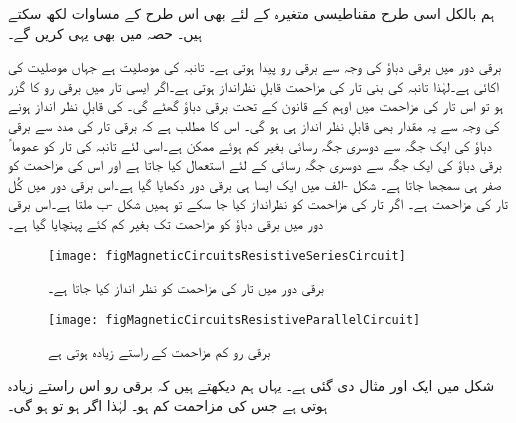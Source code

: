 	ہم بالکل اسی طرح مقناطیسی متغیرہ کے لئے بھی اس طرح کے مساوات لکھ سکتے ہیں۔ حصہ   میں بھی یہی کریں گے۔

	برقی دور میں برقی دباؤ    کی وجہ سے برقی رو  پیدا ہوتی ہے۔ تانبہ   کی موصلیت  ہے جہاں  موصلیت کی اکائی ہے۔لہٰذا تانبہ کی بنی تار کی مزاحمت    قابلِ نظرانداز ہوتی ہے۔اگر ایسی تار میں برقی رو  کا گزر ہو  تو اس تار کی مزاحمت میں اوہم کے قانون کے تحت  برقی دباؤ   گھٹے  گی۔ کی قابلِ نظر انداز ہونے کی وجہ سے یہ مقدار بھی قابلِ نظر انداز ہی ہو گی۔ اس کا مطلب ہے کہ برقی تار کی مدد سے برقی دباؤ کی ایک جگہ سے دوسری جگہ رسائی بغیر کم ہوئے ممکن ہے۔اسی لئے تانبہ کی تار کو عموما ً برقی دباؤ کی ایک جگہ سے دوسری جگہ رسائی کے لئے استعمال کیا جاتا ہے اور اس کی مزاحمت کو صفر ہی سمجھا جاتا ہے۔ شکل -الف میں ایک ایسا ہی برقی دور دکھایا گیا ہے۔اس برقی دور میں کُل تار کی مزاحمت  ہے۔ اگر تار کی مزاحمت کو نظرانداز کیا جا سکے تو ہمیں شکل -ب ملتا ہے۔اس برقی دور میں برقی دباؤ  کو مزاحمت  تک بغیر کم کئے پہنچایا گیا ہے۔
\begin{figure}
\centering
\texttt{[image: figMagneticCircuitsResistiveSeriesCircuit]}
\caption{برقی دور میں تار کی مزاحمت کو نظر انداز کیا جاتا ہے۔}
\label{شکل_مقناطیسی_دور_سلسہ_وار_مزاحمتی_ادوار}
\end{figure}
\begin{figure}
\centering
\texttt{[image: figMagneticCircuitsResistiveParallelCircuit]}
\caption{برقی رو کم مزاحمت کے راستے  زیادہ ہوتی ہے}
\label{شکل_مقناطیسی_دور_متوازی_مزاحمتی_دور}
\end{figure}
%

شکل   میں ایک اور مثال دی گئی ہے۔ یہاں ہم دیکھتے ہیں کہ برقی رو اس راستے زیادہ ہوتی ہے جس کی مزاحمت کم ہو۔ لہٰذا اگر ہو تو  ہو گی۔

